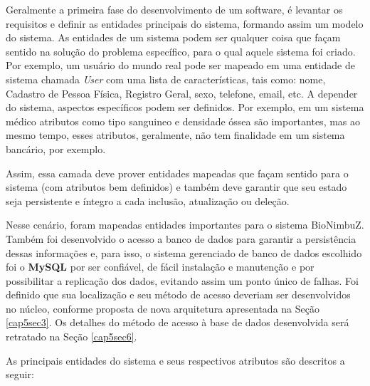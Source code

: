 Geralmente a primeira fase do desenvolvimento de um software, é levantar os requisitos e definir as entidades principais do sistema, formando assim um modelo do sistema. As entidades de um sistema podem ser qualquer coisa que façam sentido na solução do problema específico, para o qual aquele sistema foi criado. Por exemplo, um usuário do mundo real pode ser mapeado em uma entidade de sistema chamada \textit{User} com uma lista de características, tais como: nome, Cadastro de Pessoa Física, Registro Geral, sexo, telefone, email, etc. A depender do sistema, aspectos específicos podem ser definidos. Por exemplo, em um sistema médico atributos como tipo sanguineo e densidade óssea são importantes, mas ao mesmo tempo, esses atributos, geralmente, não tem finalidade em um sistema bancário, por exemplo.

Assim, essa camada deve prover entidades mapeadas que façam sentido para o sistema (com atributos bem definidos) e também deve garantir que seu estado seja persistente e íntegro a cada inclusão, atualização ou deleção. 

Nesse cenário, foram mapeadas entidades importantes para o sistema BioNimbuZ. Também foi desenvolvido o acesso a banco de dados para garantir a persistência dessas informações e, para isso, o sistema gerenciado de banco de dados escolhido foi o \textbf{MySQL} \cite{mysql_url} por ser confiável, de fácil instalação e manutenção e por possibilitar a replicação dos dados, evitando assim um ponto único de falhas. Foi definido que sua localização e seu método de acesso deveriam ser desenvolvidos no núcleo, conforme proposta de nova arquitetura apresentada na Seção \ref{cap5sec3}. Os detalhes do método de acesso à base de dados desenvolvida será retratado na Seção \ref{cap5sec6}.

As principais entidades do sistema e seus respectivos atributos são descritos a seguir:

